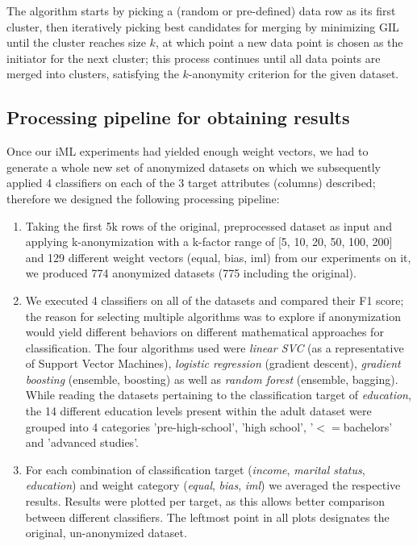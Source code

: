 \documentclass{llncs}
\begin{document}
The algorithm starts by picking a (random or pre-defined) data row as its first cluster, then iteratively picking best candidates for merging by minimizing GIL until the cluster reaches size $k$, at which point a new data point is chosen as the initiator for the next cluster; this process continues until all data points are merged into clusters, satisfying the $k$-anonymity criterion for the given dataset.


\subsection{Processing pipeline for obtaining results}
\label{ssect:process}

Once our iML experiments had yielded enough weight vectors, we had to generate a whole new set of anonymized datasets on which we subsequently applied 4 classifiers on each of the 3 target attributes (columns) described; therefore we designed the following processing pipeline:


\begin{enumerate}
	\item Taking the first 5k rows of the original, preprocessed dataset as input and applying k-anonymization with a k-factor range of [5, 10, 20, 50, 100, 200] and 129 different weight vectors (equal, bias, iml) from our experiments on it, we produced 774 anonymized datasets (775 including the original).
	\item We executed 4 classifiers on all of the datasets and compared their F1 score; the reason for selecting multiple algorithms was to explore if anonymization would yield different behaviors on different mathematical approaches for classification. The four algorithms used were \textit{linear SVC} (as a representative of Support Vector Machines), \textit{logistic regression} (gradient descent), \textit{gradient boosting} (ensemble, boosting) as well as \textit{random forest} (ensemble, bagging). While reading the datasets pertaining to the classification target of \textit{education}, the 14 different education levels present within the adult dataset were grouped into 4 categories 'pre-high-school', 'high school', '$<=$bachelors' and 'advanced studies'.
	\item For each combination of classification target (\textit{income}, \textit{marital status}, \textit{education}) and weight category (\textit{equal}, \textit{bias}, \textit{iml}) we averaged the respective results. Results were plotted per target, as this allows better comparison between different classifiers. The leftmost point in all plots designates the original, un-anonymized dataset.
\end{enumerate}
\end{document}
